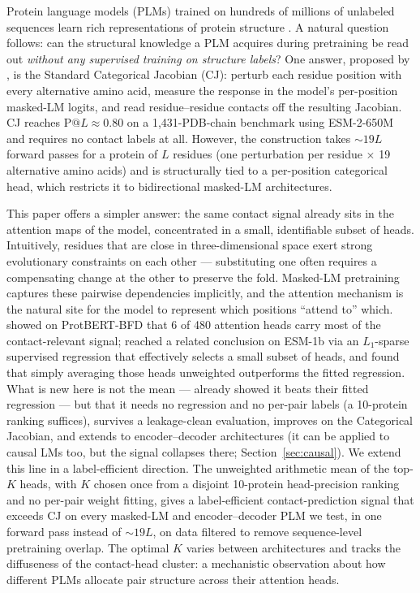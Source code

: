\documentclass{article}
\begin{document}
Protein language models (PLMs) trained on hundreds of millions of
unlabeled sequences learn rich representations of protein structure
\citep{rives2021esm1b,lin2023esm2}. A natural question follows: can
the structural knowledge a PLM acquires during pretraining be read out
\emph{without any supervised training on structure labels}? One
answer, proposed by \citet{zhang2024cj}, is the Standard Categorical
Jacobian (CJ): perturb each residue position with every alternative
amino acid, measure the response in the model's per-position masked-LM
logits, and read residue--residue contacts off the resulting Jacobian.
CJ reaches $\text{P}@L \approx 0.80$ on a 1{,}431-PDB-chain benchmark
using ESM-2-650M and requires no contact labels at all. However, the
construction takes $\sim 19L$ forward passes for a protein of $L$
residues (one perturbation per residue $\times$ 19 alternative amino
acids) and is structurally tied to a per-position categorical head,
which restricts it to bidirectional masked-LM architectures.

This paper offers a simpler answer: the same contact signal already
sits in the attention maps of the model, concentrated in a
small, identifiable subset of heads. Intuitively, residues that are
close in three-dimensional space exert strong evolutionary constraints
on each other --- substituting one often requires a compensating change
at the other to preserve the fold. Masked-LM pretraining captures
these pairwise dependencies implicitly, and the attention mechanism is
the natural site for the model to represent which positions ``attend
to'' which. \citet{bhattacharya2021attention} showed on ProtBERT-BFD
that 6 of 480 attention heads carry most of the contact-relevant
signal; \citet{rao2021transformerplm} reached a related conclusion on
ESM-1b via an $L_1$-sparse supervised regression that effectively
selects a small subset of heads, and found that simply averaging those
heads unweighted outperforms the fitted regression. What is new here
is not the mean --- \citet{rao2021transformerplm} already showed it
beats their fitted regression --- but that it needs no regression and
no per-pair labels (a 10-protein ranking suffices), survives a
leakage-clean evaluation, improves on the Categorical Jacobian, and
extends to encoder--decoder architectures (it can be applied to causal
LMs too, but the signal collapses there; Section~\ref{sec:causal}).
We extend this line in a label-efficient direction. The unweighted arithmetic mean of
the top-$K$ heads, with $K$ chosen once from a disjoint 10-protein
head-precision ranking and no per-pair weight fitting, gives a
label-efficient contact-prediction signal that exceeds CJ on every masked-LM
and encoder--decoder PLM we test, in one forward pass instead of
$\sim 19L$, on data filtered to remove sequence-level pretraining
overlap. The
optimal $K$ varies between architectures and tracks the diffuseness of
the contact-head cluster: a mechanistic observation about how different
PLMs allocate pair structure across their attention heads.
\end{document}
